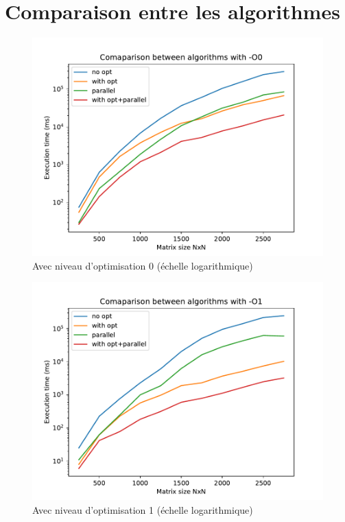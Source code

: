 \documentclass {article}
\begin{document}
\section{Comparaison entre les algorithmes}
\begin{figure}[H]
    \includegraphics[width=\linewidth]{plot/compare_O0.pdf}
    \caption{Avec niveau d'optimisation 0 (échelle logarithmique)}
    \label{fig:compare_O0}
\end{figure}

\begin{figure}[H]
    \includegraphics[width=\linewidth]{plot/compare_O1.pdf}
    \caption{Avec niveau d'optimisation 1 (échelle logarithmique)}
    \label{fig:compare_O1}
\end{figure}  
\end{document}
